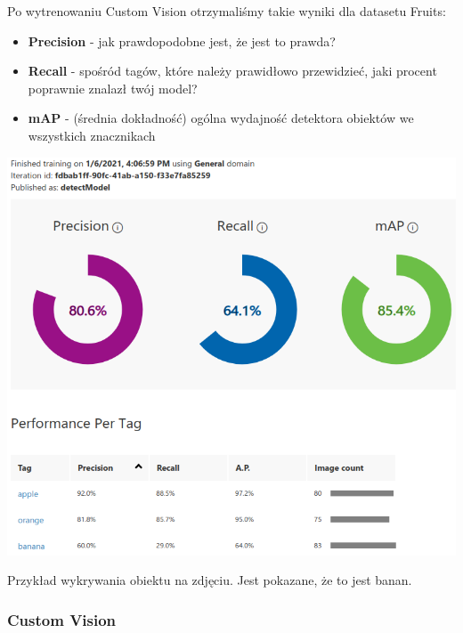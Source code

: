 \documentclass[11pt]{article}
\begin{document}
Po wytrenowaniu Custom Vision otrzymaliśmy takie wyniki dla datasetu
Fruits: 
\begin{itemize}
    \item \textbf{Precision} - jak prawdopodobne jest, że jest to
prawda?
\item \textbf{Recall} - spośród tagów, które należy prawidłowo
przewidzieć, jaki procent poprawnie znalazł twój model?
\item \textbf{mAP} -
(średnia dokładność) ogólna wydajność detektora obiektów we wszystkich
znacznikach
\end{itemize}
\includegraphics{image_report/custom_fruits.png}

    Przykład wykrywania obiektu na zdjęciu. Jest pokazane, że to jest banan.

    \hypertarget{custom-vision}{%
\subsubsection{Custom Vision}\label{custom-vision}}
\end{document}
